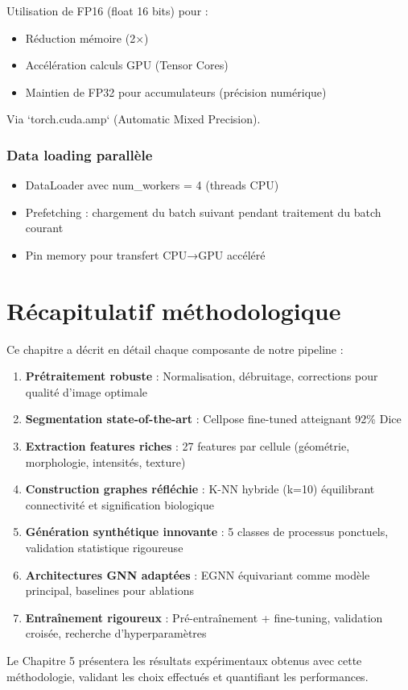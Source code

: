 Utilisation de FP16 (float 16 bits) pour :
\begin{itemize}
    \item Réduction mémoire (2×)
    \item Accélération calculs GPU (Tensor Cores)
    \item Maintien de FP32 pour accumulateurs (précision numérique)
\end{itemize}

Via `torch.cuda.amp` (Automatic Mixed Precision).

\subsubsection{Data loading parallèle}

\begin{itemize}
    \item DataLoader avec num\_workers = 4 (threads CPU)
    \item Prefetching : chargement du batch suivant pendant traitement du batch courant
    \item Pin memory pour transfert CPU→GPU accéléré
\end{itemize}

\section{Récapitulatif méthodologique}

Ce chapitre a décrit en détail chaque composante de notre pipeline :

\begin{enumerate}
    \item \textbf{Prétraitement robuste} : Normalisation, débruitage, corrections pour qualité d'image optimale
    \item \textbf{Segmentation state-of-the-art} : Cellpose fine-tuned atteignant 92\% Dice
    \item \textbf{Extraction features riches} : 27 features par cellule (géométrie, morphologie, intensités, texture)
    \item \textbf{Construction graphes réfléchie} : K-NN hybride (k=10) équilibrant connectivité et signification biologique
    \item \textbf{Génération synthétique innovante} : 5 classes de processus ponctuels, validation statistique rigoureuse
    \item \textbf{Architectures GNN adaptées} : EGNN équivariant comme modèle principal, baselines pour ablations
    \item \textbf{Entraînement rigoureux} : Pré-entraînement + fine-tuning, validation croisée, recherche d'hyperparamètres
\end{enumerate}

Le Chapitre 5 présentera les résultats expérimentaux obtenus avec cette méthodologie, validant les choix effectués et quantifiant les performances.
